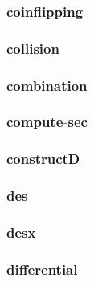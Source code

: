 \begin{frame}\frametitle{coinflipping}
\begin{figure}
\begin{center}

\end{center}
\end{figure}
\end{frame}
\begin{frame}\frametitle{collision}
\begin{figure}
\begin{center}

\end{center}
\end{figure}
\end{frame}
\begin{frame}\frametitle{combination}
\begin{figure}
\begin{center}

\end{center}
\end{figure}
\end{frame}
\begin{frame}\frametitle{compute-sec}
\begin{figure}
\begin{center}

\end{center}
\end{figure}
\end{frame}
\begin{frame}\frametitle{constructD}
\begin{figure}
\begin{center}

\end{center}
\end{figure}
\end{frame}
\begin{frame}\frametitle{des}
\begin{figure}
\begin{center}

\end{center}
\end{figure}
\end{frame}
\begin{frame}\frametitle{desx}
\begin{figure}
\begin{center}

\end{center}
\end{figure}
\end{frame}
\begin{frame}\frametitle{differential}
\begin{figure}
\begin{center}

\end{center}
\end{figure}
\end{frame}
